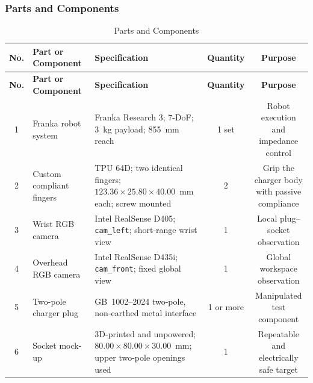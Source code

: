 \documentclass[12pt, letterpaper]{article}
\begin{document}
\subsubsection{Parts and Components}
\begin{landscape}
\begingroup
\small
\setlength{\tabcolsep}{4pt}

\begin{longtable}{cllcc}
\caption{Parts and Components}\label{tab:parts-components}\\
\toprule
\textbf{No.} & \textbf{Part or Component} & \textbf{Specification} & \textbf{Quantity} & \textbf{Purpose} \\
\midrule
\endfirsthead
\toprule
\textbf{No.} & \textbf{Part or Component} & \textbf{Specification} & \textbf{Quantity} & \textbf{Purpose} \\
\midrule
\endhead
1 & Franka robot system & \makecell[l]{Franka Research 3; 7-DoF;\\3~kg payload; 855~mm reach} & 1 set & \makecell[c]{Robot execution\\and impedance control}\\
2 & Custom compliant fingers & \makecell[l]{TPU 64D; two identical fingers;\\
\(123.36\times25.80\times40.00\)~mm each;\\screw mounted} & 2 & \makecell[c]{Grip the charger body\\with passive compliance}\\
3 & Wrist RGB camera & \makecell[l]{Intel RealSense D405;\\
\texttt{cam\_left}; short-range wrist view} & 1 & \makecell[c]{Local plug--socket\\observation}\\
4 & Overhead RGB camera & \makecell[l]{Intel RealSense D435i;\\
\texttt{cam\_front}; fixed global view} & 1 & \makecell[c]{Global workspace\\observation}\\
5 & Two-pole charger plug & \makecell[l]{GB~1002--2024 two-pole,\\non-earthed metal interface} & 1 or more & \makecell[c]{Manipulated\\test component}\\
6 & Socket mock-up & \makecell[l]{3D-printed and unpowered;\\
\(80.00\times80.00\times30.00\)~mm;\\upper two-pole openings used} & 1 & \makecell[c]{Repeatable and\\electrically safe target}\\

\end{longtable}
\end{landscape}
\end{document}
